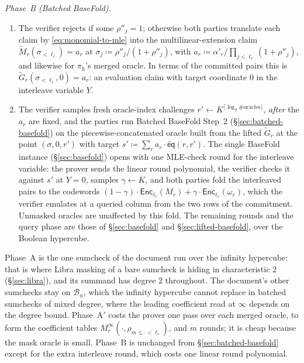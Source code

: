 \documentclass{article}
\theoremstyle{definition}
\newcommand*{\mle}{\widetilde}
\newcommand{\eq}{\mathsf{eq}}
\newcommand{\BB}{\mathcal{B}}
\begin{document}
\begin{protocol}
\emph{Phase~B (Batched BaseFold).}
\begin{enumerate}
\item The verifier rejects if some $\rho''_j = 1$; otherwise both parties translate each claim by \eqref{eq:monomial-to-mle} into the multilinear-extension claim $\mle{M}_r(\sigma_{< \ell_r}) = a_r$ at $\sigma_j \coloneqq \rho''_j / (1 + \rho''_j)$, with $a_r \coloneqq \alpha'_r / \prod_{j < \ell_r} (1 + \rho''_j)$, and likewise for $\pi_h$'s merged oracle. In terms of the committed pairs this is $\mle{G}_r(\sigma_{< \ell_r}, 0) = a_r$: an evaluation claim with target coordinate $0$ in the interleave variable $Y$.
\item The verifier samples fresh oracle-index challenges $r' \gets K^{\lceil \log_2 \#\text{oracles} \rceil}$, \emph{after} the $a_r$ are fixed, and the parties run Batched BaseFold Step~2 (\S\ref{sec:batched-basefold}) on the piecewise-concatenated oracle built from the lifted $\mle{G}_r$ at the point $(\sigma, 0, r')$ with target $s' \coloneqq \sum_r a_r \cdot \mle{\eq}(r, r')$. The single BaseFold instance (\S\ref{sec:basefold}) opens with one MLE-check round for the interleave variable: the prover sends the linear round polynomial, the verifier checks it against $s'$ at $Y = 0$, samples $\gamma \gets K$, and both parties fold the interleaved pairs to the codewords $(1 - \gamma) \cdot \textsf{Enc}_{\ell_r}(M_r) + \gamma \cdot \textsf{Enc}_{\ell_r}(\omega_r)$, which the verifier emulates at a queried column from the two rows of the commitment. Unmasked oracles are unaffected by this fold. The remaining rounds and the query phase are those of \S\ref{sec:basefold} and \S\ref{sec:lifted-basefold}, over the Boolean hypercube.
\end{enumerate}
\end{protocol}

Phase~A is the one sumcheck of the document run over the infinity hypercube: that is where Libra masking of a bare sumcheck is hiding in characteristic $2$ (\S\ref{sec:libra}), and its summand has degree $2$ throughout. The document's other sumchecks stay on $\BB_n$, which the infinity hypercube cannot replace in batched sumchecks of mixed degree, where the leading coefficient read at $\infty$ depends on the degree bound. Phase~A$'$ costs the prover one pass over each merged oracle, to form the coefficient tables $M_r^\infty(\cdot, \rho_{m \le \cdot < \ell_r})$, and $m$ rounds; it is cheap because the mask oracle is small. Phase~B is unchanged from \S\ref{sec:batched-basefold} except for the extra interleave round, which costs one linear round polynomial.
\end{document}
